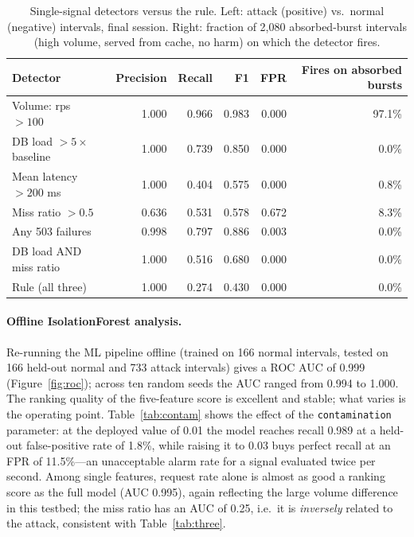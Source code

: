 \documentclass[preprint,12pt]{elsarticle}
\begin{document}
\begin{table}[t]
\centering
\caption{Single-signal detectors versus the rule. Left: attack (positive) vs.\ normal
(negative) intervals, final session. Right: fraction of 2{,}080 absorbed-burst
intervals (high volume, served from cache, no harm) on which the detector fires.}
\label{tab:single}
\small
\begin{tabular}{@{}lrrrr|r@{}}
\toprule
Detector & Precision & Recall & F1 & FPR & Fires on absorbed bursts \\
\midrule
Volume: rps $>100$ & 1.000 & 0.966 & 0.983 & 0.000 & 97.1\% \\
DB load $>5\times$ baseline & 1.000 & 0.739 & 0.850 & 0.000 & 0.0\% \\
Mean latency $>200$ ms & 1.000 & 0.404 & 0.575 & 0.000 & 0.8\% \\
Miss ratio $>0.5$ & 0.636 & 0.531 & 0.578 & 0.672 & 8.3\% \\
Any 503 failures & 0.998 & 0.797 & 0.886 & 0.003 & 0.0\% \\
DB load AND miss ratio & 1.000 & 0.516 & 0.680 & 0.000 & 0.0\% \\
Rule (all three) & 1.000 & 0.274 & 0.430 & 0.000 & 0.0\% \\
\bottomrule
\end{tabular}
\end{table}

\paragraph{Offline IsolationForest analysis.} Re-running the ML pipeline offline
(trained on 166 normal intervals, tested on 166 held-out normal and 733 attack
intervals) gives a ROC AUC of 0.999 (Figure~\ref{fig:roc}); across ten random seeds
the AUC ranged from 0.994 to 1.000. The ranking quality of the five-feature score is
excellent and stable; what varies is the operating point. Table~\ref{tab:contam} shows
the effect of the \texttt{contamination} parameter: at the deployed value of 0.01 the
model reaches recall 0.989 at a held-out false-positive rate of 1.8\%, while raising it
to 0.03 buys perfect recall at an FPR of 11.5\%---an unacceptable alarm rate for a
signal evaluated twice per second. Among single features, request rate alone is
almost as good a ranking score as the full model (AUC 0.995), again reflecting the
large volume difference in this testbed; the miss ratio has an AUC of 0.25, i.e.\ it is
\emph{inversely} related to the attack, consistent with Table~\ref{tab:three}.
\end{document}
